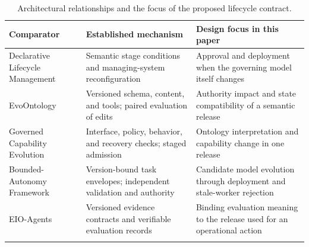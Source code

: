 \documentclass[preprint,12pt,authoryear]{elsarticle}
\begin{document}
\begin{table}[!htbp]\centering\footnotesize
\caption{Architectural relationships and the focus of the proposed
lifecycle contract.}
\medskip
\begin{tabular}{@{}
  >{\raggedright\arraybackslash}p{}
  >{\raggedright\arraybackslash}p{}
  >{\raggedright\arraybackslash}p{}@{}}
\toprule\noalign{}
\begin{minipage}[b]{\linewidth}\raggedright
Comparator
\end{minipage} & \begin{minipage}[b]{\linewidth}\raggedright
Established mechanism
\end{minipage} & \begin{minipage}[b]{\linewidth}\raggedright
Design focus in this paper
\end{minipage} \\
\midrule\noalign{}

Declarative Lifecycle Management & Semantic stage conditions and
managing-system reconfiguration & Approval and deployment when the
governing model itself changes \\
\addlinespace[7pt]
EvoOntology & Versioned schema, content, and tools; paired evaluation of
edits & Authority impact and state compatibility of a semantic
release \\
\addlinespace[7pt]
Governed Capability Evolution & Interface, policy, behavior, and
recovery checks; staged admission & Ontology interpretation and
capability change in one release \\
\addlinespace[7pt]
Bounded-Autonomy Framework & Version-bound task envelopes; independent
validation and authority & Candidate model evolution through deployment
and stale-worker rejection \\
\addlinespace[7pt]
EIO-Agents & Versioned evidence contracts and verifiable evaluation
records & Binding evaluation meaning to the release used for an
operational action \\
\addlinespace[7pt]
\bottomrule
\end{tabular}
\end{table}
\end{document}
